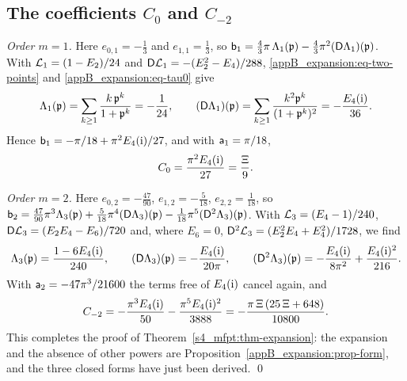 \subsection{The coefficients \texorpdfstring{$C_{0}$}{C0} and \texorpdfstring{$C_{-2}$}{C-2}}

\emph{Order $m=1$.} Here $e_{0,1}=-\tfrac13$ and $e_{1,1}=\tfrac13$, so
$\mathsf{b}_1=\tfrac43\pi\,\Lambda_1(\mathfrak{p})-\tfrac43\pi^{2}(\mathsf{D}\Lambda_1)(\mathfrak{p})$. With
$\mathcal{L}_1=(1-E_2)/24$ and $\mathsf{D}\mathcal{L}_1=-(E_2^{2}-E_4)/288$, \eqref{appB_expansion:eq-two-points} and
\eqref{appB_expansion:eq-tau0} give
\begin{equation}\label{appB_expansion:eq-m1}
  \Lambda_1(\mathfrak{p})=\sum_{k\ge1}\frac{k\,\mathfrak{p}^{k}}{1+\mathfrak{p}^{k}}=-\frac1{24},\qquad
  (\mathsf{D}\Lambda_1)(\mathfrak{p})=\sum_{k\ge1}\frac{k^{2}\mathfrak{p}^{k}}{(1+\mathfrak{p}^{k})^{2}}=-\frac{E_4(\mathrm{i})}{36}.
\end{equation}
Hence $\mathsf{b}_1=-\pi/18+\pi^{2}E_4(\mathrm{i})/27$, and with $\mathsf{a}_1=\pi/18$,
\begin{equation*}
  C_{0}=\frac{\pi^{2}E_4(\mathrm{i})}{27}=\frac{\Xi}{9}.
\end{equation*}

\emph{Order $m=2$.} Here $e_{0,2}=-\tfrac{47}{90}$, $e_{1,2}=-\tfrac5{18}$, $e_{2,2}=\tfrac1{18}$, so
$\mathsf{b}_2=\tfrac{47}{90}\pi^{3}\Lambda_3(\mathfrak{p})+\tfrac5{18}\pi^{4}(\mathsf{D}\Lambda_3)(\mathfrak{p})-\tfrac1{18}\pi^{5}(\mathsf{D}^{2}\Lambda_3)(\mathfrak{p})$.
With $\mathcal{L}_3=(E_4-1)/240$, $\mathsf{D}\mathcal{L}_3=(E_2E_4-E_6)/720$ and, where $E_6=0$,
$\mathsf{D}^{2}\mathcal{L}_3=(E_2^{2}E_4+E_4^{2})/1728$, we find
\begin{equation}\label{appB_expansion:eq-m2}
  \Lambda_3(\mathfrak{p})=\frac{1-6E_4(\mathrm{i})}{240},\qquad (\mathsf{D}\Lambda_3)(\mathfrak{p})=-\frac{E_4(\mathrm{i})}{20\pi},\qquad
  (\mathsf{D}^{2}\Lambda_3)(\mathfrak{p})=-\frac{E_4(\mathrm{i})}{8\pi^{2}}+\frac{E_4(\mathrm{i})^{2}}{216}.
\end{equation}
With $\mathsf{a}_2=-47\pi^{3}/21600$ the terms free of $E_4(\mathrm{i})$ cancel again, and
\begin{equation*}
  C_{-2}=-\frac{\pi^{3}E_4(\mathrm{i})}{50}-\frac{\pi^{5}E_4(\mathrm{i})^{2}}{3888}=-\frac{\pi\,\Xi\,(25\,\Xi+648)}{10800}.
\end{equation*}
This completes the proof of Theorem~\ref{s4_mfpt:thm-expansion}: the expansion and the absence of other powers are
Proposition~\ref{appB_expansion:prop-form}, and the three closed forms have just been derived. \qed


